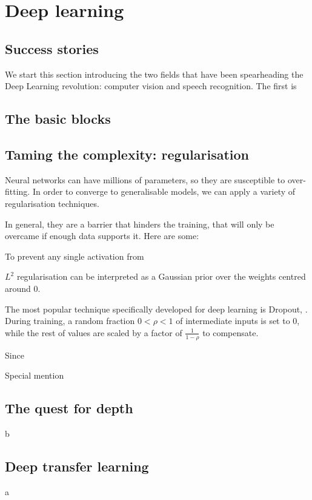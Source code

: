 \chapter{Deep learning}
\section{Success stories}
We start this section introducing the two fields that have been spearheading the Deep Learning revolution: computer vision and speech recognition.
The first is 

\section{The basic blocks}
\section{Taming the complexity: regularisation}
Neural networks can have millions of parameters, so they are susceptible to over-fitting.
In order to converge to generalisable models, we can apply a variety of regularisation techniques.

In general, they are a barrier that hinders the training, that will only be overcame if enough data supports it.
Here are some:

To prevent any single activation from

$L^2$ regularisation can be interpreted as a Gaussian prior over the weights centred around $0$.

The most popular technique  
specifically developed for deep learning is Dropout, \citep{dropout}. 
During training, a random fraction $0 < \rho < 1$ of intermediate inputs is set to $0$, while the rest of values are scaled by a factor of $\frac{1}{1-\rho}$ to compensate.

Since 


Special mention


\section{The quest for depth}
b
\section{Deep transfer learning}
a


